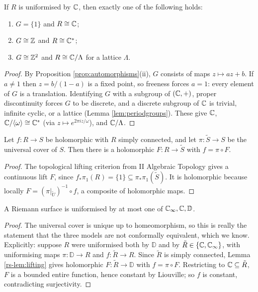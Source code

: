 \documentclass[a4paper]{scrartcl}
\newcommand{\genby}[1]{\langle #1 \rangle}
\newcommand{\Cinf}{\C_\infty}
\newcommand{\disc}{\mathbb{D}}
\newcommand{\Cs}{\C^*}
\begin{document}
\begin{proposition}\label{prop:uniformbyC}
	If $R$ is uniformised by $\mathbb{C}$, then exactly one of the following holds:
	\begin{enumerate}[label=(\roman*)]
		\item $G = \{1\}$ and $R \cong \mathbb{C}$;
		\item $G \cong \mathbb{Z}$ and $R \cong \Cs$;
		\item $G \cong \mathbb{Z}^2$ and $R\cong\mathbb{C}/\Lambda$ for a lattice $\Lambda$.
	\end{enumerate}
\end{proposition}

\begin{proof}
	By Proposition \ref{prop:automorphisms}(ii), $G$ consists of maps $z\mapsto az+b$. If
	$a \neq 1$ then $z = b/(1-a)$ is a fixed point, so freeness forces $a = 1$: every
	element of $G$ is a translation. Identifying $G$ with a subgroup of $(\mathbb{C},+)$, proper
	discontinuity forces $G$ to be discrete, and a discrete subgroup of $\mathbb{C}$ is trivial,
	infinite cyclic, or a lattice (Lemma \ref{lem:periodgroups}). These give
	$\mathbb{C}$, $\C/\genby\omega \cong \Cs$ (via $z\mapsto e^{2\pi i z/\omega}$), and $\mathbb{C}/\Lambda$.
\end{proof}

\begin{lemma}\label{rs-lem:lifting}
	Let $f : R\to S$ be holomorphic with $R$ simply connected, and let $\pi : \tilde S\to S$
	be the universal cover of $S$. Then there is a holomorphic $F : R \to \tilde S$ with
	$f = \pi\circ F$.
\end{lemma}

\begin{proof}
	The topological lifting criterion from II Algebraic Topology gives a continuous lift
	$F$, since $f_*\pi_1(R) = \{1\} \subseteq \pi_*\pi_1(\tilde S)$. It is holomorphic
	because locally $F = (\pi|_{\tilde U})^{-1}\circ f$, a composite of holomorphic maps.
\end{proof}

\begin{proposition}
	A Riemann surface is uniformised by at most one of $\Cinf,\C,\disc$.
\end{proposition}

\begin{proof}
	The universal cover is unique up to homeomorphism, so this is really the statement that
	the three models are not conformally equivalent, which we know. Explicitly: suppose $R$
	were uniformised both by $\disc$ and by $\tilde R \in \{\C,\Cinf\}$, with uniformising
	maps $\pi : \disc \to R$ and $f : \tilde R \to R$. Since $\tilde R$ is simply connected,
	Lemma \ref{rs-lem:lifting} gives holomorphic $F : \tilde R \to \disc$ with $f = \pi\circ F$.
	Restricting to $\mathbb{C} \subseteq \tilde R$, $F$ is a bounded entire function, hence constant
	by Liouville; so $f$ is constant, contradicting surjectivity.
\end{proof}
\end{document}
